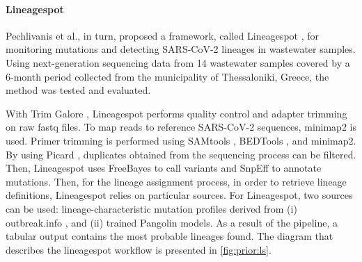         \paragraph{Lineagespot}
        Pechlivanis et al., in turn, proposed a framework, called Lineagespot \cite{pechlivanis2022}, for monitoring mutations and detecting SARS-CoV-2 lineages in wastewater samples. Using next-generation sequencing data from 14 wastewater samples covered by a 6-month period collected from the municipality of Thessaloniki, Greece, the method was tested and evaluated. 

        With Trim Galore \cite{krueger2021}, Lineagespot performs quality control and adapter trimming on raw \acrshort{fastq} files. To map reads to reference SARS-CoV-2 sequences, minimap2 \cite{li2018} is used. Primer trimming is performed using SAMtools \cite{li2009}, BEDTools \cite{bedtools}, and minimap2. By using Picard \cite{picard}, duplicates obtained from the sequencing process can be filtered. Then, Lineagespot uses FreeBayes \cite{garrison2012} to call variants and SnpEff \cite{snpeff} to annotate mutations. Then, for the lineage assignment process, in order to retrieve lineage definitions, Lineagespot relies on particular sources. For Lineagespot, two sources can be used: lineage-characteristic mutation profiles derived from (i) outbreak.info \cite{outbreakinfo}, and (ii) trained Pangolin \cite{otoole2021} models. As a result of the pipeline, a tabular output contains the most probable lineages found. The diagram that describes the lineagespot workflow is presented in \cref{fig:prior:ls}.
        
